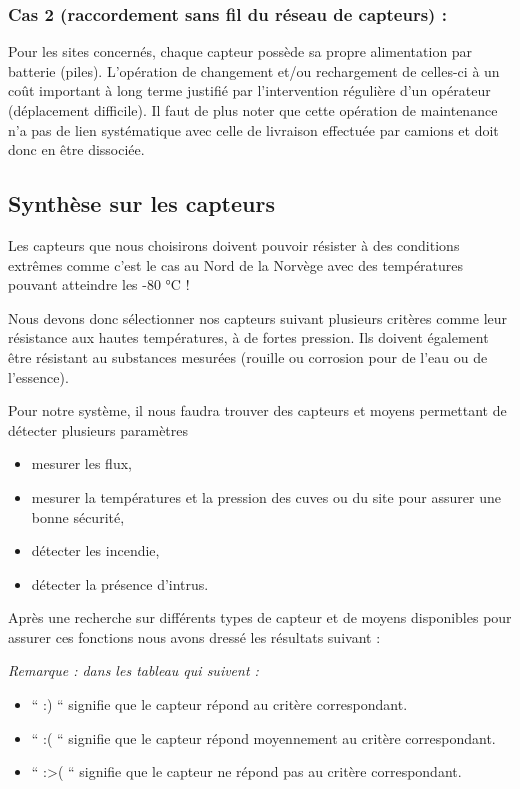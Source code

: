 \documentclass{article}
\begin{document}
\subsubsection{Cas 2 (raccordement sans fil du réseau de capteurs) :}

Pour les sites concernés, chaque capteur possède sa propre alimentation
par batterie (piles). L’opération de changement et/ou rechargement de
celles-ci à un coût important à long terme justifié par l’intervention
régulière d’un opérateur (déplacement difficile). Il faut de plus noter
que cette opération de maintenance n’a pas de lien systématique avec
celle de livraison effectuée par camions et doit donc en être
dissociée.

\subsection{Synthèse sur les capteurs}

Les capteurs que nous choisirons doivent pouvoir résister à des
conditions extrêmes comme c’est le cas au Nord de la Norvège avec des
températures pouvant atteindre les -80 °C !

Nous devons donc sélectionner nos capteurs suivant plusieurs critères
comme leur résistance aux hautes températures, à de fortes pression.
Ils doivent également être résistant au substances mesurées (rouille ou
corrosion pour de l’eau ou de l’essence).




Pour notre système, il nous faudra trouver des capteurs et moyens
permettant de détecter plusieurs paramètres

\begin{itemize}
\item mesurer les flux, 
\item mesurer la températures et la pression des cuves ou du site pour
assurer une bonne sécurité,
\item détecter les incendie,
\item détecter la présence d’intrus.
\end{itemize}



Après une recherche sur différents types de capteur et de moyens
disponibles pour assurer ces fonctions nous avons dressé les résultats
suivant :

\emph{Remarque : dans les tableau qui suivent :}
\begin{itemize}
\item  “ :) “ signifie que le capteur répond au critère correspondant.
\item  “ :( “ signifie que le capteur répond moyennement au critère
correspondant.
\item  “ :{\textgreater}( “ signifie que le capteur ne répond pas au
critère correspondant.
\end{itemize}
\end{document}
